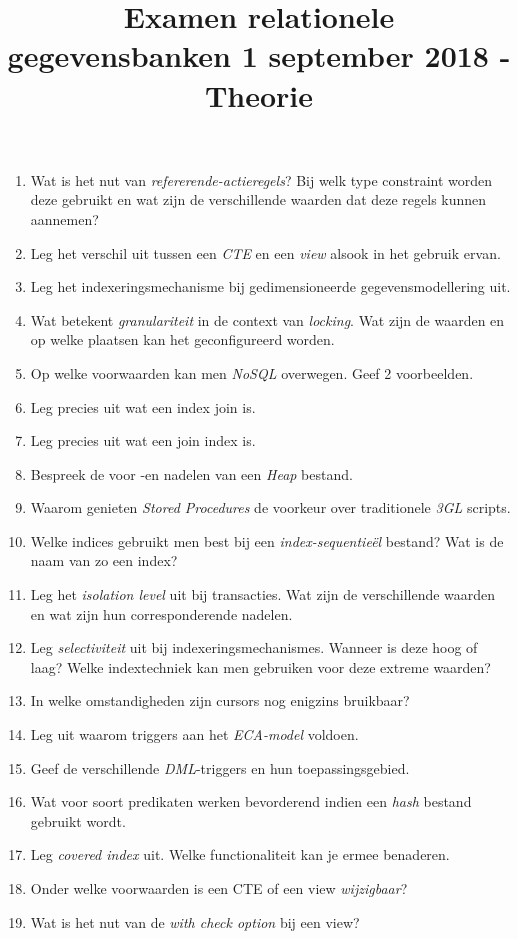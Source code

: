 \documentclass{article}
\title{Examen relationele gegevensbanken 1 september 2018 - Theorie}
\date{}
\author{}
\begin{document}
\maketitle
\begin{enumerate}
 \item Wat is het nut van \textit{refererende-actieregels}? Bij welk type constraint worden deze gebruikt en wat zijn de verschillende waarden dat deze regels kunnen aannemen?
 \item Leg het verschil uit tussen een \textit{CTE} en een \textit{view} alsook in het gebruik ervan.
 \item Leg het indexeringsmechanisme bij gedimensioneerde gegevensmodellering uit.
 \item Wat betekent \textit{granulariteit} in de context van \textit{locking}. Wat zijn de waarden en op welke plaatsen kan het geconfigureerd worden.
 \item Op welke voorwaarden kan men \textit{NoSQL} overwegen. Geef 2 voorbeelden.
 \item Leg precies uit wat een index join is.
 \item Leg precies uit wat een join index is.
 \item Bespreek de voor -en nadelen van een \textit{Heap} bestand.
 \item Waarom genieten \textit{Stored Procedures} de voorkeur over traditionele \textit{3GL} scripts.
 \item Welke indices gebruikt men best bij een \textit{index-sequentieël} bestand? Wat is de naam van zo een index?
 \item Leg het \textit{isolation level} uit bij transacties. Wat zijn de verschillende waarden
 en wat zijn hun corresponderende nadelen.
 \item Leg \textit{selectiviteit} uit bij indexeringsmechanismes. Wanneer is deze hoog of laag? Welke indextechniek kan men gebruiken voor deze extreme waarden?
 \item In welke omstandigheden zijn cursors nog enigzins bruikbaar?
 \item Leg uit waarom triggers aan het \textit{ECA-model} voldoen.
 \item Geef de verschillende \textit{DML}-triggers en hun toepassingsgebied.
 \item Wat voor soort predikaten werken bevorderend indien een \textit{hash} bestand gebruikt wordt.
 \item Leg \textit{covered index} uit. Welke functionaliteit kan je ermee benaderen.
 \item Onder welke voorwaarden is een CTE of een view \textit{wijzigbaar}?
 \item Wat is het nut van de \textit{with check option} bij een view?
\end{enumerate}
\end{document}
